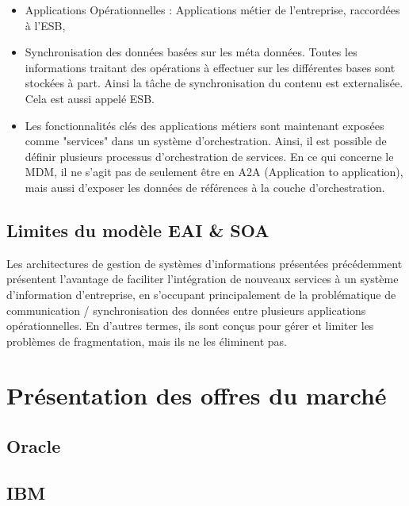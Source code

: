 \begin{itemize}

\item Applications Opérationnelles : Applications métier de l'entreprise, raccordées à l'ESB, 

\item Synchronisation des données basées sur les méta données. Toutes les informations traitant  des opérations à effectuer sur les différentes bases sont stockées à part. Ainsi la tâche de synchronisation du contenu est externalisée. Cela est aussi appelé ESB.

\item Les fonctionnalités clés des applications métiers sont maintenant exposées  comme "services" dans un système d'orchestration. Ainsi, il est possible de définir plusieurs processus d'orchestration de services. En ce qui concerne le MDM, il ne s'agit pas de seulement être en A2A (Application to application), mais aussi d'exposer les données de références à la couche d'orchestration.

\end{itemize}

\subsection{Limites du modèle EAI \& SOA}

Les architectures de gestion de systèmes d'informations présentées précédemment présentent l'avantage de faciliter l'intégration de nouveaux services à un système d'information d'entreprise, en s'occupant principalement de la problématique de communication / synchronisation des données entre plusieurs applications opérationnelles. En d'autres termes, ils sont conçus pour gérer et limiter les problèmes de fragmentation, mais ils ne les éliminent pas.\\


\section{Présentation des offres du marché}

\subsection{Oracle}

\subsection{IBM}
